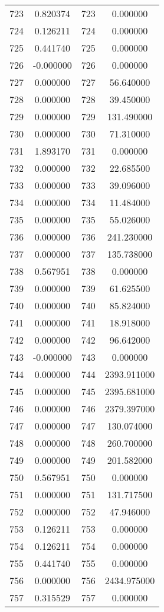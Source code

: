 \documentclass[12pt]{article}
\begin{document}
\begin{longtable}{@{}cccc@{}}
723 & 0.820374 & 723 & 0.000000 \\
724 & 0.126211 & 724 & 0.000000 \\
725 & 0.441740 & 725 & 0.000000 \\
726 & -0.000000 & 726 & 0.000000 \\
727 & 0.000000 & 727 & 56.640000 \\
728 & 0.000000 & 728 & 39.450000 \\
729 & 0.000000 & 729 & 131.490000 \\
730 & 0.000000 & 730 & 71.310000 \\
731 & 1.893170 & 731 & 0.000000 \\
732 & 0.000000 & 732 & 22.685500 \\
733 & 0.000000 & 733 & 39.096000 \\
734 & 0.000000 & 734 & 11.484000 \\
735 & 0.000000 & 735 & 55.026000 \\
736 & 0.000000 & 736 & 241.230000 \\
737 & 0.000000 & 737 & 135.738000 \\
738 & 0.567951 & 738 & 0.000000 \\
739 & 0.000000 & 739 & 61.625500 \\
740 & 0.000000 & 740 & 85.824000 \\
741 & 0.000000 & 741 & 18.918000 \\
742 & 0.000000 & 742 & 96.642000 \\
743 & -0.000000 & 743 & 0.000000 \\
744 & 0.000000 & 744 & 2393.911000 \\
745 & 0.000000 & 745 & 2395.681000 \\
746 & 0.000000 & 746 & 2379.397000 \\
747 & 0.000000 & 747 & 130.074000 \\
748 & 0.000000 & 748 & 260.700000 \\
749 & 0.000000 & 749 & 201.582000 \\
750 & 0.567951 & 750 & 0.000000 \\
751 & 0.000000 & 751 & 131.717500 \\
752 & 0.000000 & 752 & 47.946000 \\
753 & 0.126211 & 753 & 0.000000 \\
754 & 0.126211 & 754 & 0.000000 \\
755 & 0.441740 & 755 & 0.000000 \\
756 & 0.000000 & 756 & 2434.975000 \\
757 & 0.315529 & 757 & 0.000000 \\

\end{longtable}
\end{document}
